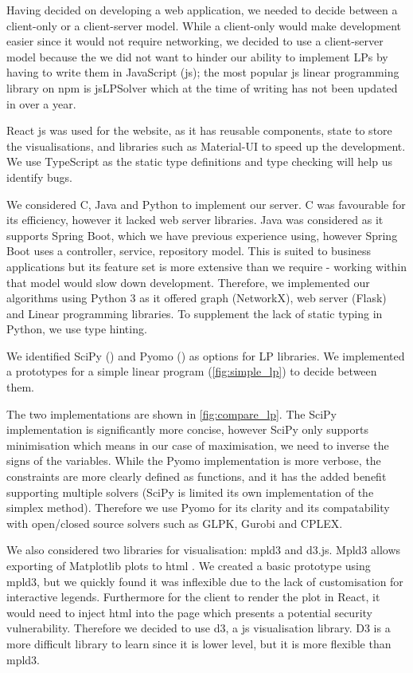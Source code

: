Having decided on developing a web application, we needed to decide between a client-only or a client-server model. While a client-only would make development easier since it would not require networking, we decided to use a client-server model because the we did not want to hinder our ability to implement LPs by having to write them in JavaScript (\acrshort{js}); the most popular \acrshort{js} linear programming library on npm is jsLPSolver which at the time of writing has not been updated in over a year.

React \acrshort{js} was used for the website, as it has reusable components, state to store the visualisations, and libraries such as Material-UI to speed up the development. We use TypeScript as the static type definitions and type checking will help us identify bugs.

We considered C, Java and Python to implement our server. C was favourable for its efficiency, however it lacked web server libraries. Java was considered as it supports Spring Boot, which we have previous experience using, however Spring Boot uses a controller, service, repository model. This is suited to business applications but its feature set is more extensive than we require - working within that model would slow down development. Therefore, we implemented our algorithms using Python 3 as it offered graph (NetworkX), web server (Flask) and Linear programming libraries. To supplement the lack of static typing in Python, we use type hinting.

We identified SciPy (\cite{nmeth_scipy_2020}) and Pyomo (\cite{hart_pyomo_2011}) as options for LP libraries. We implemented a prototypes for a simple linear program (\cref{fig:simple_lp}) to decide between them.



The two implementations are shown in \cref{fig:compare_lp}. The SciPy implementation is significantly more concise, however SciPy only supports minimisation which means in our case of maximisation, we need to inverse the signs of the variables. While the Pyomo implementation is more verbose, the constraints are more clearly defined as functions, and it has the added benefit supporting multiple solvers (SciPy is limited its own implementation of the simplex method). Therefore we use Pyomo for its clarity and its compatability with open/closed source solvers such as GLPK, Gurobi and CPLEX.



We also considered two libraries for visualisation: mpld3 and \acrshort{d3}.js. Mpld3 allows exporting of Matplotlib plots to \acrshort{html} . We created a basic prototype using mpld3, but we quickly found it was inflexible due to the lack of customisation for interactive legends. Furthermore for the client to render the plot in React, it would need to inject \acrshort{html} into the page which presents a potential security vulnerability. Therefore we decided to use \acrshort{d3}, a \acrshort{js} visualisation library. D3 is a more difficult library to learn since it is lower level, but it is more flexible than mpld3.